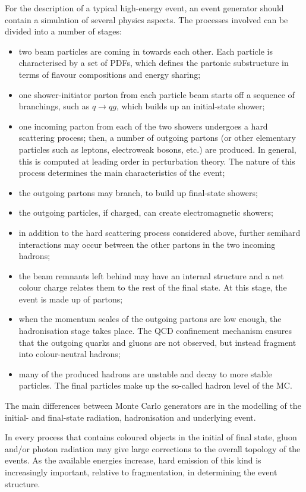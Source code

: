 \documentclass[12pt, twoside]{article}
\numberwithin{equation}{section}
\numberwithin{figure}{section}
\begin{document}
For the description of a typical high-energy event, an event generator should contain a simulation of several physics aspects. The processes involved can be divided into a number of stages:
\begin{itemize}
    \item two beam particles are coming in towards each other. Each particle is characterised by a set of PDFs, which defines the partonic substructure in terms of flavour compositions and energy sharing;
    \item one shower-initiator parton from each particle beam starts off a sequence of branchings, such as $q \rightarrow q g$, which builds up an initial-state shower;
    \item one incoming parton from each of the two showers undergoes a hard scattering process; then, a number of outgoing partons (or other elementary particles such as leptons, electroweak bosons, etc.) are produced. In general, this is computed at leading order in perturbation theory. The nature of this process determines the main characteristics of the event;
    \item the outgoing partons may branch, to build up final-state showers;
    \item the outgoing particles, if charged, can create electromagnetic showers;
    \item in addition to the hard scattering process considered above, further semihard interactions may occur between the other partons in the two incoming hadrons;
    \item the beam remnants left behind may have an internal structure and a net colour charge relates them to the rest of the final state. At this stage, the event is made up of partons;
    \item when the momentum scales of the outgoing partons are low enough, the hadronisation stage takes place. The QCD confinement mechanism ensures that the outgoing quarks and gluons are not observed, but instead fragment into colour-neutral hadrons;
    \item many of the produced hadrons are unstable and decay to more stable particles. The final particles make up the so-called hadron level of the MC.
\end{itemize}

The main differences between Monte Carlo generators are in the modelling of the initial- and final-state radiation, hadronisation and underlying event.

In every process that contains coloured objects in the initial of final state, gluon and/or photon radiation may give large corrections to the overall topology of the events. As the available energies increase, hard emission of this kind is increasingly important, relative to fragmentation, in determining the event structure.
\end{document}
